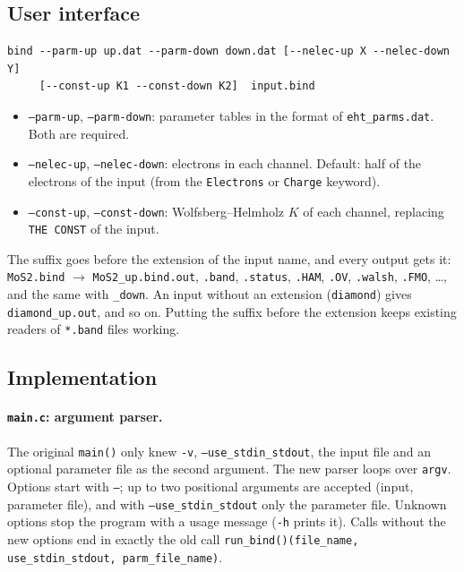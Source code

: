 \documentclass[11pt,a4paper]{article}
\newcommand{\file}[1]{\texttt{#1}}
\newcommand{\fn}[1]{\texttt{#1()}}
\newcommand{\var}[1]{\texttt{#1}}
\newcommand{\opt}[1]{\texttt{#1}}
\begin{document}
\subsection{User interface}

\begin{lstlisting}[style=sh]
bind --parm-up up.dat --parm-down down.dat [--nelec-up X --nelec-down Y]
     [--const-up K1 --const-down K2]  input.bind
\end{lstlisting}
\begin{itemize}
\item \opt{--parm-up}, \opt{--parm-down}: parameter tables in the format of
  \file{eht\_parms.dat}. Both are required.
\item \opt{--nelec-up}, \opt{--nelec-down}: electrons in each channel. Default: half of the
  electrons of the input (from the \texttt{Electrons} or \texttt{Charge} keyword).
\item \opt{--const-up}, \opt{--const-down}: Wolfsberg--Helmholz $K$ of each channel,
  replacing \texttt{THE CONST} of the input.
\end{itemize}

The suffix goes before the extension of the input name, and every output gets it:
\texttt{MoS2.bind} $\to$ \texttt{MoS2\_up.bind.out}, \texttt{.band}, \texttt{.status},
\texttt{.HAM}, \texttt{.OV}, \texttt{.walsh}, \texttt{.FMO}, \ldots, and the same with
\texttt{\_down}. An input without an extension (\texttt{diamond}) gives
\texttt{diamond\_up.out}, and so on. Putting the suffix before the extension keeps
existing readers of \texttt{*.band} files working.

\subsection{Implementation}

\paragraph{\file{main.c}: argument parser.} The original \fn{main} only knew
\texttt{-v}, \texttt{--use\_stdin\_stdout}, the input file and an optional parameter file
as the second argument. The new parser loops over \var{argv}. Options start with
\texttt{--}; up to two positional arguments are accepted (input, parameter file), and with
\texttt{--use\_stdin\_stdout} only the parameter file. Unknown options stop the program
with a usage message (\texttt{-h} prints it). Calls without the new options end in exactly
the old call \fn{run\_bind}\texttt{(file\_name, use\_stdin\_stdout, parm\_file\_name)}.
\end{document}
